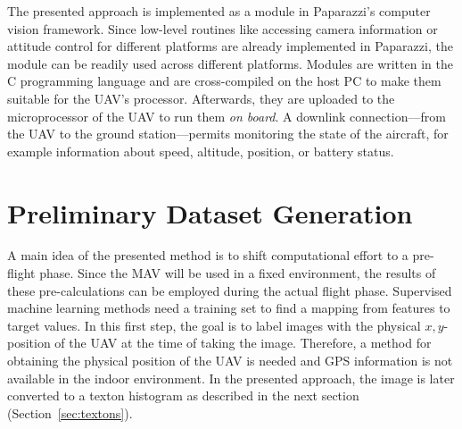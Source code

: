 \documentclass[11pt]{report}
\begin{document}
%

The presented approach is implemented as a module in Paparazzi's
computer vision framework. Since low-level routines like accessing
camera information or attitude control for different platforms are
already implemented in Paparazzi, the module can be readily used
across different platforms. Modules are written in the C programming
language and are cross-compiled on the host PC to make them suitable
for the UAV's processor. Afterwards, they are uploaded to the
microprocessor of the UAV to run them \emph{on board}. A downlink
connection---from the UAV to the ground station---permits monitoring
the state of the aircraft, for example information about speed,
altitude, position, or battery status.

\section{Preliminary Dataset Generation}
\label{sec:mapping}


A main idea of the presented method is to shift computational effort
to a pre-flight phase. Since the MAV will be used in a fixed
environment, the results of these pre-calculations can be employed
during the actual flight phase. Supervised machine learning methods
need a training set to find a mapping from features to target
values. In this first step, the goal is to label images with the
physical $x,y$-position of the UAV at the time of taking the
image. Therefore, a method for obtaining the physical position of the
UAV is needed and GPS information is not available in the indoor
environment. In the presented approach, the image is later converted
to a texton histogram as described in the next section
(Section~\ref{sec:textons}).
\end{document}
